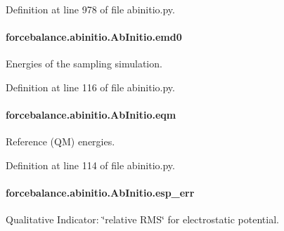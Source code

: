 Definition at line 978 of file abinitio.\-py.

\hypertarget{classforcebalance_1_1abinitio_1_1AbInitio_af928d333d14cb3b93f7db78530455873}{
\paragraph[{emd0}]{\setlength{\rightskip}{0pt plus 5cm}forcebalance.\-abinitio.\-Ab\-Initio.\-emd0}}\label{classforcebalance_1_1abinitio_1_1AbInitio_af928d333d14cb3b93f7db78530455873}


Energies of the sampling simulation. 



Definition at line 116 of file abinitio.\-py.

\hypertarget{classforcebalance_1_1abinitio_1_1AbInitio_a64387fae9bdfb0d03ca6961e67c779be}{
\paragraph[{eqm}]{\setlength{\rightskip}{0pt plus 5cm}forcebalance.\-abinitio.\-Ab\-Initio.\-eqm}}\label{classforcebalance_1_1abinitio_1_1AbInitio_a64387fae9bdfb0d03ca6961e67c779be}


Reference (Q\-M) energies. 



Definition at line 114 of file abinitio.\-py.

\hypertarget{classforcebalance_1_1abinitio_1_1AbInitio_abdc625c3149cee375b56b4e0d73034fe}{
\paragraph[{esp\-\_\-err}]{\setlength{\rightskip}{0pt plus 5cm}forcebalance.\-abinitio.\-Ab\-Initio.\-esp\-\_\-err}}\label{classforcebalance_1_1abinitio_1_1AbInitio_abdc625c3149cee375b56b4e0d73034fe}


Qualitative Indicator\-: \char`\"{}relative R\-M\-S\char`\"{} for electrostatic potential. 




